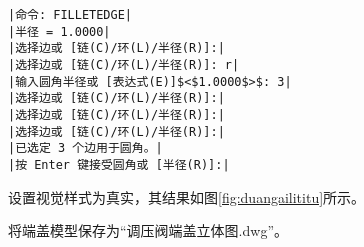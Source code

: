 \begin{procedure}
\begin{lstlisting}
|命令: FILLETEDGE|
|半径 = 1.0000|
|选择边或 [链(C)/环(L)/半径(R)]:|
|选择边或 [链(C)/环(L)/半径(R)]: r|
|输入圆角半径或 [表达式(E)]$<$1.0000$>$: 3|
|选择边或 [链(C)/环(L)/半径(R)]:|  
|选择边或 [链(C)/环(L)/半径(R)]:|
|选择边或 [链(C)/环(L)/半径(R)]:|
|已选定 3 个边用于圆角。|
|按 Enter 键接受圆角或 [半径(R)]:|
\end{lstlisting}
\item 设置视觉样式为真实，其结果如图\ref{fig:duangailititu}所示。
\item 将端盖模型保存为“调压阀端盖立体图.dwg”。
\end{procedure}

